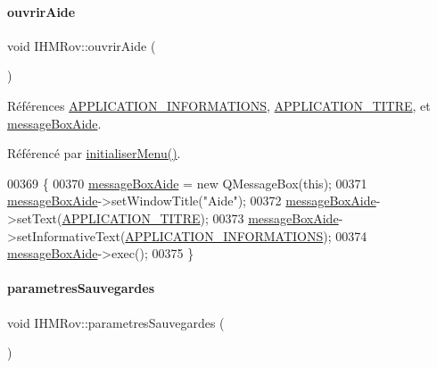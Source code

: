 \mbox{\label{class_i_h_m_rov_a45a10161fde8c6373918ec30f16a8b5e}} 
\paragraph{\texorpdfstring{ouvrir\+Aide}{ouvrirAide}}
{\footnotesize\ttfamily void I\+H\+M\+Rov\+::ouvrir\+Aide (\begin{DoxyParamCaption}{ }\end{DoxyParamCaption})\hspace{0.3cm}{\ttfamily [slot]}}



Références \hyperlink{ihmrov_8h_afbc72a1675bd9c5173820a3b874f1fa6}{A\+P\+P\+L\+I\+C\+A\+T\+I\+O\+N\+\_\+\+I\+N\+F\+O\+R\+M\+A\+T\+I\+O\+NS}, \hyperlink{ihmrov_8h_ab599af93fd63f0c5df05b03aa7448eb9}{A\+P\+P\+L\+I\+C\+A\+T\+I\+O\+N\+\_\+\+T\+I\+T\+RE}, et \hyperlink{class_i_h_m_rov_a8a6bdcda8ffc99b12b7232c988f6e797}{message\+Box\+Aide}.



Référencé par \hyperlink{class_i_h_m_rov_aebbcb2325c2d1a88a012d8408e2d6223}{initialiser\+Menu()}.


\begin{DoxyCode}
00369 \{
00370     \hyperlink{class_i_h_m_rov_a8a6bdcda8ffc99b12b7232c988f6e797}{messageBoxAide} = \textcolor{keyword}{new} QMessageBox(\textcolor{keyword}{this});
00371     \hyperlink{class_i_h_m_rov_a8a6bdcda8ffc99b12b7232c988f6e797}{messageBoxAide}->setWindowTitle(\textcolor{stringliteral}{"Aide"});
00372     \hyperlink{class_i_h_m_rov_a8a6bdcda8ffc99b12b7232c988f6e797}{messageBoxAide}->setText(\hyperlink{ihmrov_8h_ab599af93fd63f0c5df05b03aa7448eb9}{APPLICATION\_TITRE});
00373     \hyperlink{class_i_h_m_rov_a8a6bdcda8ffc99b12b7232c988f6e797}{messageBoxAide}->setInformativeText(\hyperlink{ihmrov_8h_afbc72a1675bd9c5173820a3b874f1fa6}{APPLICATION\_INFORMATIONS});
00374     \hyperlink{class_i_h_m_rov_a8a6bdcda8ffc99b12b7232c988f6e797}{messageBoxAide}->exec();
00375 \}
\end{DoxyCode}
\mbox{\label{class_i_h_m_rov_accf04daf204c5810c8a6099bb7e37b7e}} 
\paragraph{\texorpdfstring{parametres\+Sauvegardes}{parametresSauvegardes}}
{\footnotesize\ttfamily void I\+H\+M\+Rov\+::parametres\+Sauvegardes (\begin{DoxyParamCaption}{ }\end{DoxyParamCaption})\hspace{0.3cm}{\ttfamily [signal]}}



